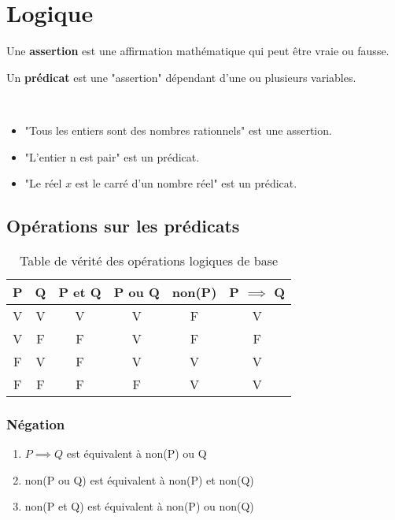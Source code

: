 \chapter{Logique}
\begin{graybox}
	\begin{definition}[Assertion]
		\par Une \textbf{assertion} est une affirmation mathématique qui peut être vraie ou fausse.
	\end{definition}
\end{graybox}

\begin{graybox}
	\begin{definition}[Prédicat]
		\par Un \textbf{prédicat} est une "assertion" dépendant d'une ou plusieurs variables.
	\end{definition}
\end{graybox}

\begin{exemple}~
\begin{itemize}
\item "Tous les entiers sont des nombres rationnels" est une assertion.
\item "L'entier n est pair" est un prédicat.
\item "Le réel $x$ est le carré d'un nombre réel" est un prédicat.
\end{itemize}
\end{exemple}
\section{Opérations sur les prédicats}
\begin{table}[h!]
\centering
\begin{tabular}{cccccc}
P & Q & P et Q & P ou Q & non(P) & P $\implies$ Q \\
\hline
V & V & V & V & F & V \\
V & F & F & V & F & F \\
F & V & F & V & V & V \\
F & F & F & F & V & V \\
\hline
\end{tabular}
\caption{Table de vérité des opérations logiques de base}
\end{table}

\subsection{Négation}
\begin{enumerate}
\item $P \implies Q$ est équivalent à non(P) ou Q
\item non(P ou Q) est équivalent à non(P) et non(Q)
\item non(P et Q) est équivalent à non(P) ou non(Q)
\end{enumerate}

